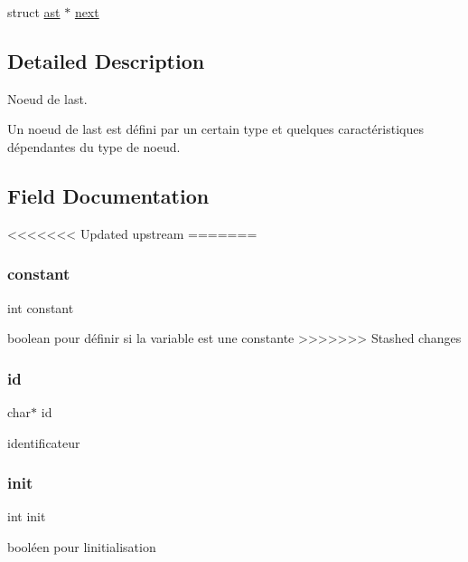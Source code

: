 \begin{DoxyCompactItemize}
\begin{tabbing}
\end{tabbing}\item 
struct \hyperlink{structast}{ast} $\ast$ \hyperlink{structast_ae48f04f7acec87ecf7f0bc953cb56bf4}{next}
\end{DoxyCompactItemize}


\subsection{Detailed Description}
Noeud de l\textquotesingle{}ast. 

Un noeud de l\textquotesingle{}ast est défini par un certain type et quelques caractéristiques dépendantes du type de noeud. 

\subsection{Field Documentation}
<<<<<<< Updated upstream
\mbox{\label{structast_aecb3b0d045ada529257a2fbf8f829599}} 
=======
\mbox{\label{structast_ac347bb44c6dc857729453831c5714f84}} 
\subsubsection{\texorpdfstring{constant}{constant}}
{\footnotesize\ttfamily int constant}

boolean pour définir si la variable est une constante \mbox{\label{structast_aecb3b0d045ada529257a2fbf8f829599}} 
>>>>>>> Stashed changes
\subsubsection{\texorpdfstring{id}{id}}
{\footnotesize\ttfamily char$\ast$ id}

identificateur \mbox{\label{structast_a795ea50921b36311ffd5e7baa2ef1f7e}} 
\subsubsection{\texorpdfstring{init}{init}}
{\footnotesize\ttfamily int init}

booléen pour l\textquotesingle{}initialisation \mbox{\label{structast_ae48f04f7acec87ecf7f0bc953cb56bf4}} 
